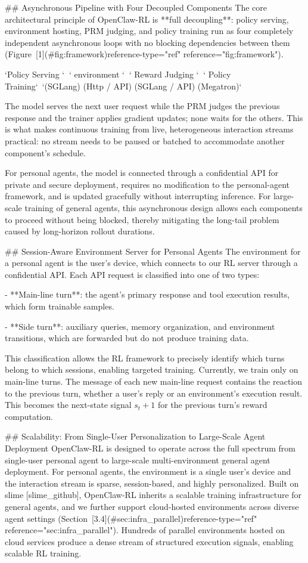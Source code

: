 ## Asynchronous Pipeline with Four Decoupled Components
The core architectural principle of OpenClaw-RL is **full decoupling**: policy serving, environment hosting, PRM judging, and policy training run as four completely independent asynchronous loops with no blocking dependencies between them (Figure [1](#fig:framework)reference-type="ref" reference="fig:framework").


`Policy Serving `$\;\;$` environment `$\;\;$` Reward Judging `$\;\;$` Policy Training`\
`(SGLang) (Http / API) (SGLang / API) (Megatron)`

The model serves the next user request while the PRM judges the previous response and the trainer applies gradient updates; none waits for the others. This is what makes continuous training from live, heterogeneous interaction streams practical: no stream needs to be paused or batched to accommodate another component's schedule.

For personal agents, the model is connected through a confidential API for private and secure deployment, requires no modification to the personal-agent framework, and is updated gracefully without interrupting inference. For large-scale training of general agents, this asynchronous design allows each components to proceed without being blocked, thereby mitigating the long-tail problem caused by long-horizon rollout durations.

## Session-Aware Environment Server for Personal Agents
The environment for a personal agent is the user's device, which connects to our RL server through a confidential API. Each API request is classified into one of two types:

-   **Main-line turn**: the agent's primary response and tool execution results, which form trainable samples.

-   **Side turn**: auxiliary queries, memory organization, and environment transitions, which are forwarded but do not produce training data.

This classification allows the RL framework to precisely identify which turns belong to which sessions, enabling targeted training. Currently, we train only on main-line turns. The message of each new main-line request contains the reaction to the previous turn, whether a user's reply or an environment's execution result. This becomes the next-state signal $s_t+1$ for the previous turn's reward computation.

## Scalability: From Single-User Personalization to Large-Scale Agent Deployment
OpenClaw-RL is designed to operate across the full spectrum from single-user personal agent to large-scale multi-environment general agent deployment. For personal agents, the environment is a single user's device and the interaction stream is sparse, session-based, and highly personalized. Built on slime [slime_github], OpenClaw-RL inherits a scalable training infrastructure for general agents, and we further support cloud-hosted environments across diverse agent settings (Section [3.4](#sec:infra_parallel)reference-type="ref" reference="sec:infra_parallel"). Hundreds of parallel environments hosted on cloud services produce a dense stream of structured execution signals, enabling scalable RL training.

